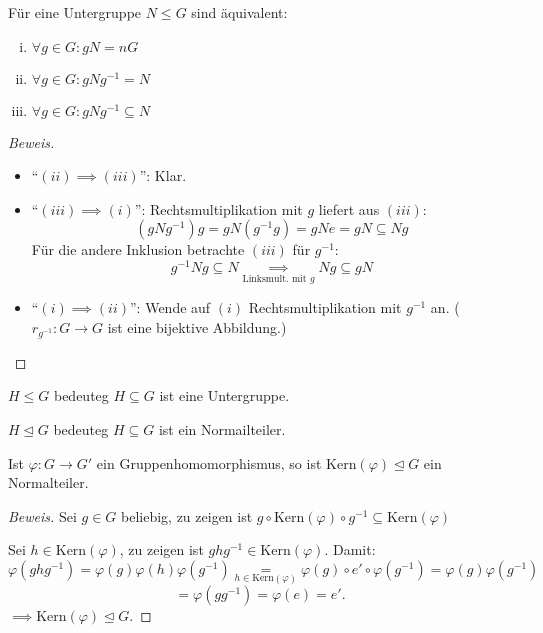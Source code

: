 \documentclass[a4paper]{report}
\begin{document}
\begin{lemm}
  Für eine Untergruppe $N \le G$ sind äquivalent:
  \begin{enumerate}[(i)]
    \item $\forall g \in G : gN = nG$
    \item $\forall g \in G : gNg^{-1} = N$
    \item $\forall g \in G : gNg^{-1} \subseteq N$
  \end{enumerate}
  \begin{proof}[Beweis]
\begin{itemize}
\item ``$(ii)\implies (iii)$'': Klar.
  \item ``$(iii)\implies (i)$'': Rechtsmultiplikation mit $g$ liefert aus $(iii)$:
        $$(gNg^{-1})g = gN(g^{-1}g) = gNe = gN \subseteq Ng$$
        Für die andere Inklusion betrachte $(iii)$ für $g^{-1}$:
        $$g^{-1}Ng \subseteq N \underset{\text{Linksmult. mit }g}\implies Ng \subseteq gN$$
\item ``$(i)\implies (ii)$'': Wende auf $(i)$ Rechtsmultiplikation mit $g^{-1}$ an. ($r_{g^{-1}}: G \to G$ ist eine bijektive Abbildung.)
\end{itemize}
  \end{proof}
\end{lemm}

\begin{nota*}
  \item $H \le G$ bedeuteg $H \subseteq G$ ist eine Untergruppe.
  \item $H \trianglelefteq G$ bedeuteg $H \subseteq G$ ist ein Normailteiler.
\end{nota*}

\begin{satz}
  Ist $\varphi : G \to G'$ ein Gruppenhomomorphismus, so ist $\mathrm{Kern}(\varphi) \trianglelefteq G$ ein Normalteiler.
  \begin{proof}[Beweis]
    Sei $g \in G$ beliebig, zu zeigen ist $g \circ \mathrm{Kern}(\varphi) \circ g^{-1} \subseteq \mathrm{Kern}(\varphi)$
    \item Sei $h \in \mathrm{Kern}(\varphi)$, zu zeigen ist $ghg^{-1} \in \mathrm{Kern}(\varphi)$.
    Damit:
    $$\varphi(ghg^{-1}) = \varphi(g)\varphi(h)\varphi(g^{-1}) \underset{h \in \mathrm{Kern}(\varphi)} = \varphi(g) \circ e' \circ \varphi(g^{-1}) = \varphi(g)\varphi(g^{-1})$$
    $$= \varphi(gg^{-1}) = \varphi(e) = e'.$$
    $\implies \mathrm{Kern}(\varphi) \trianglelefteq G.$
  \end{proof}
\end{satz}
\end{document}
